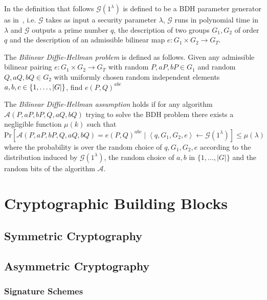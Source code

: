 In the definition that follows $\mathcal{G} \left( 1^{\lambda} \right)$ is defined to be a BDH parameter generator as in~\cite{art:BonehF01}, i.e. $\mathcal{G}$ takes as input a security parameter $\lambda$, $\mathcal{G}$ runs in polynomial time in $\lambda$ and $\mathcal{G}$ outputs a prime number $q$, the description of two groups $G_1, G_2$ of order $q$ and the description of an admissible bilinear map $e: G_1 \times G_2 \rightarrow G_T$.
\begin{defn}[BDH]
\label{def:bdh}
The \textit{Bilinear Diffie-Hellman problem} is defined as follows. Given any admissible bilinear pairing $e: G_1 \times G_2 \rightarrow G_T$ with random $P, aP, bP \in G_1$ and random $Q, aQ, bQ \in G_2$ with uniformly chosen random independent elements $a, b, c \medskip \in \{ 1, \ldots, | G |\}$, find $e \left( P, Q \right)^{abc}$

The \textit{Bilinear Diffie-Hellman assumption} holds if for any algorithm \\ $\mathcal{A} \left( P, aP, bP, Q, aQ, bQ \right)$ trying to solve the BDH problem there exists a negligible function $\mu \left( k \right)$ such that 
 \begin{equation*}
  \textrm{Pr} \left[ \mathcal{A} \left( P, aP, bP, Q, aQ, bQ \right) = e \left( P, Q \right)^{abc} \mid \left< q, G_1, G_2, e \right> \leftarrow \mathcal{G} \left( 1^{\lambda} \right)\right] \leq \mu \left( \lambda \right)
 \end{equation*}
 where the probability is over the random choice of $q, G_1, G_2, e$ according to the distribution induced by $\mathcal{G} \left( 1^{\lambda} \right)$, the random choice of $a, b$ in $\{ 1, \ldots, | G |\}$ and the random bits of the algorithm $\mathcal{A}$.
\end{defn}
\section{Cryptographic Building Blocks}
\subsection{Symmetric Cryptography}
\subsection{Asymmetric Cryptography}
\subsubsection{Signature Schemes}
